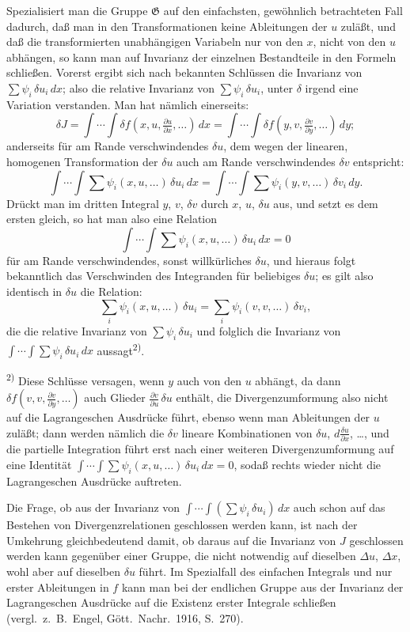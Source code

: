 \documentclass[12pt,a4paper]{article}
\begin{document}
Spezialisiert man die Gruppe $\mathfrak{G}$ auf den einfachsten, gew\"ohnlich betrachteten Fall dadurch, da\ss{} man in den Transformationen keine Ableitungen der $u$ zul\"a\ss{}t, und da\ss{} die transformierten unabh\"angigen Variabeln nur von den $x$, nicht von den $u$ abh\"angen, so kann man auf Invarianz der einzelnen Bestandteile in den Formeln schlie\ss{}en. Vorerst ergibt sich nach bekannten Schl\"ussen die Invarianz von $\sum\psi_{i}\,\delta u_{i}\,dx$; also die relative Invarianz von $\sum\psi_{i}\,\delta u_{i}$, unter $\delta$ irgend eine Variation verstanden. Man hat n\"amlich einerseits:
\[
\delta J=\int\cdots\int\delta f(x,u,\tfrac{\partial u}{\partial x},\ldots)\,dx=\int\cdots\int\delta f(y,v,\tfrac{\partial v}{\partial y},\ldots)\,dy;
\]
anderseits f\"ur am Rande verschwindendes $\delta u$, dem wegen der linearen, homogenen Transformation der $\delta u$ auch am Rande verschwindendes $\delta v$ entspricht:
\[
\int\cdots\int\sum\psi_{i}(x,u,\ldots)\,\delta u_{i}\,dx
=\int\cdots\int\sum\psi_{i}(y,v,\ldots)\,\delta v_{i}\,dy.
\]
Dr\"uckt man im dritten Integral $y$, $v$, $\delta v$ durch $x$, $u$, $\delta u$ aus, und setzt es dem ersten gleich, so hat man also eine Relation
\[
\int\cdots\int\sum\psi_{i}(x,u,\ldots)\,\delta u_{i}\,dx=0
\]
f\"ur am Rande verschwindendes, sonst willk\"urliches $\delta u$, und hieraus folgt bekanntlich das Verschwinden des Integranden f\"ur beliebiges $\delta u$; es gilt also identisch in $\delta u$ die Relation:
\[
\sum_{i}\psi_{i}(x,u,\ldots)\,\delta u_{i}=\sum_{i}\psi_{i}(v,v,\ldots)\,\delta v_{i},
\]
die die relative Invarianz von $\sum\psi_{i}\,\delta u_{i}$ und folglich die Invarianz von $\int\cdots\int\sum\psi_{i}\,\delta u_{i}\,dx$ aussagt\textsuperscript{2)}.

\smallskip
\noindent\textsuperscript{2)} Diese Schl\"usse versagen, wenn $y$ auch von den $u$ abh\"angt, da dann $\delta f(v,v,\tfrac{\partial v}{\partial y},\ldots)$ auch Glieder $\tfrac{\partial v}{\partial u}\,\delta u$ enth\"alt, die Divergenzumformung also nicht auf die Lagrangeschen Ausdr\"ucke f\"uhrt, ebenso wenn man Ableitungen der $u$ zul\"a\ss{}t; dann werden n\"amlich die $\delta v$ lineare Kombinationen von $\delta u$, $d\tfrac{\delta u}{\partial x}$, \ldots{}, und die partielle Integration f\"uhrt erst nach einer weiteren Divergenzumformung auf eine Identit\"at $\int\cdots\int\sum\psi_{i}(x,u,\ldots)\,\delta u_{i}\,dx=0$, soda\ss{} rechts wieder nicht die Lagrangeschen Ausdr\"ucke auftreten.

Die Frage, ob aus der Invarianz von $\int\cdots\int(\sum\psi_{i}\,\delta u_{i})\,dx$ auch schon auf das Bestehen von Divergenzrelationen geschlossen werden kann, ist nach der Umkehrung gleichbedeutend damit, ob daraus auf die Invarianz von $J$ geschlossen werden kann gegen\"uber einer Gruppe, die nicht notwendig auf dieselben $\Delta u$, $\Delta x$, wohl aber auf dieselben $\delta u$ f\"uhrt. Im Spezialfall des einfachen Integrals und nur erster Ableitungen in $f$ kann man bei der endlichen Gruppe aus der Invarianz der Lagrangeschen Ausdr\"ucke auf die Existenz erster Integrale schlie\ss{}en (vergl.\ z.\ B.\ Engel, G\"ott.\ Nachr.\ 1916, S.\ 270).
\end{document}
